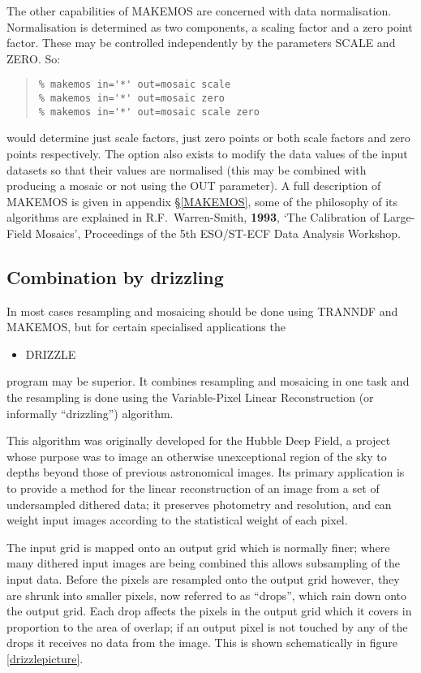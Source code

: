 \documentclass[twoside,11pt]{article}
\newcommand{\hyperref}[4]{#2\ref{#4}#3}
\newcommand{\htmlref}[2]{#1}
\newcommand{\xlabel}[1]{}
\renewcommand{\_}{\texttt{\symbol{95}}}
\newenvironment{myquote}{\begin{quote}\begin{small}}{\end{small}\end{quote}}
\newcommand{\routine}[1]{{\sc #1}}
\newcommand{\xroutine}[1]{\htmlref{{\sc #1}}{#1}}
\begin{document}
The other capabilities of \routine{MAKEMOS} are concerned 
with data normalisation.
Normalisation is determined as two components, a scaling factor and a
zero point factor. These may be controlled independently by the
parameters SCALE and ZERO. So:
\begin{myquote}
\begin{verbatim}
% makemos in='*' out=mosaic scale
% makemos in='*' out=mosaic zero
% makemos in='*' out=mosaic scale zero
\end{verbatim}
\end{myquote}
would determine just scale factors, just zero points or both scale
factors and zero points respectively. The option also exists to modify
the data values of the input datasets so that their values are
normalised (this may be combined with producing a mosaic or not using
the OUT parameter). A full description of \routine{MAKEMOS}
is given in appendix \S\ref{MAKEMOS}, some of the philosophy of
its algorithms are explained in R.F.~Warren-Smith, {\bf 1993},
`The Calibration of Large-Field Mosaics', Proceedings of the 5th
ESO/ST-ECF Data Analysis Workshop.


\subsection{\label{drizzling}\xlabel{drizzling}Combination by drizzling}

In most cases resampling and mosaicing should be done using
\routine{TRANNDF} and \routine{MAKEMOS}, but for certain specialised
applications the
\begin{itemize}
\item \xroutine{DRIZZLE}
\end{itemize}
program may be superior. 
It combines resampling and mosaicing in one task
and the resampling is done using the Variable-Pixel Linear Reconstruction
(or informally ``drizzling'') algorithm.

This algorithm was originally developed for the Hubble Deep
Field, a project whose purpose was to image an otherwise unexceptional
region of the sky to depths beyond those of previous astronomical images.
Its primary application is to provide a method for the linear
reconstruction of an image from a set of undersampled dithered data;
it preserves photometry and resolution, and can weight input images
according to the statistical weight of each pixel.

The input grid is mapped onto an output grid which is normally
finer; where many dithered input images are being combined this
allows subsampling of the input data.
Before the pixels are resampled onto the output grid however,
they are shrunk into smaller pixels, now referred to as ``drops'',
which rain down onto the output grid.
Each drop affects the pixels in the output grid which it covers
in proportion to the area of overlap; if an output pixel is
not touched by any of the drops it receives no data from the image.
This is shown schematically 
in \hyperref{the figure}{figure }{}{drizzlepicture}.
\end{document}
